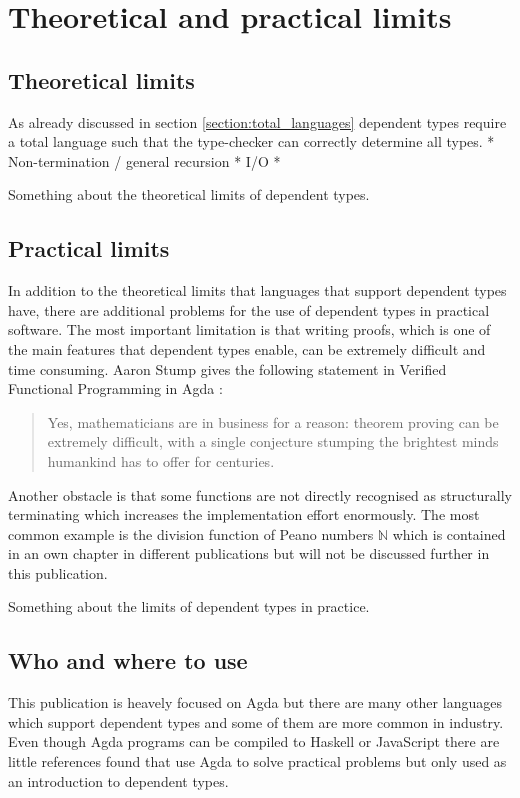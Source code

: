 \section{Theoretical and practical limits}
\subsection{Theoretical limits}
As already discussed in section \ref{section:total_languages} dependent types require a total language such that the type-checker can correctly determine all types.
* Non-termination / general recursion
* I/O
* 

Something about the theoretical limits of dependent types.
\subsection{Practical limits}
In addition to the theoretical limits that languages that support dependent types have, there are additional problems for the use of dependent types in practical software.
The most important limitation is that writing proofs, which is one of the main features that dependent types enable, can be extremely difficult and time consuming.
Aaron Stump gives the following statement in Verified Functional Programming in Agda \cite{10.1145/2841316}:
\begin{quote}
Yes, mathematicians are in business for a reason: theorem proving can be extremely difficult, with a single conjecture stumping the brightest minds humankind has to offer for centuries.
\end{quote}

Another obstacle is that some functions are not directly recognised as structurally terminating which increases the implementation effort enormously.
The most common example is the division function of Peano numbers $\mathbb{N}$ which is contained in an own chapter in different publications \cite{10.1145/2841316, Bove2009} but will not be discussed further in this publication. 

Something about the limits of dependent types in practice.
\subsection{Who and where to use}
This publication is heavely focused on Agda but there are many other languages which support dependent types and some of them are more common in industry.
Even though Agda programs can be compiled to Haskell or JavaScript there are little references found that use Agda to solve practical problems but only used as an introduction to dependent types.


